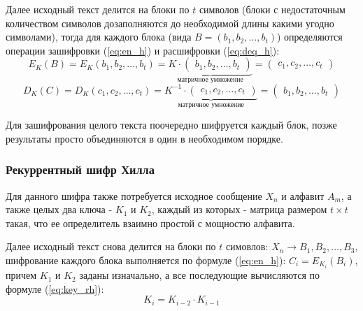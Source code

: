 \documentclass[a4paper]{article}
\begin{document}
  Далее исходный текст делится на блоки по $t$ символов (блоки с недостаточным количеством символов
  дозаполняются до необходимой длины какими угодно символами), тогда для каждого блока (вида $B = (b_1, b_2, \dots, b_t)$)
  определяются операции зашифровки (\ref{eq:en_h}) и расшифровки (\ref{eq:deq_h}):
  \begin{equation}
    E_K(B) = E_K(b_1, b_2, \dots, b_t) = \underset{\text{матричное умножение}}{\underbrace{K \cdot \begin{pmatrix}
        b_1, b_2, \dots, b_t
    \end{pmatrix}}} = \begin{pmatrix}
        c_1, c_2, \dots, c_t
    \end{pmatrix}
    \label{eq:en_h}
  \end{equation}
  \begin{equation}
    D_K(C) = D_K(c_1, c_2, \dots, c_t) = \underset{\text{матричное умножение}}{\underbrace{K^{-1} \cdot 
    \begin{pmatrix}
        c_1, c_2, \dots, c_t
    \end{pmatrix}
    }} = \begin{pmatrix}
        b_1, b_2, \dots, b_t
    \end{pmatrix}
    \label{eq:deq_h}
  \end{equation}

  Для зашифрования целого текста поочередно шифруется каждый блок, позже результаты просто объединяются в один в необходимом порядке.

  \subsubsection{Рекуррентный шифр Хилла}

  Для данного шифра также потребуется исходное сообщение $X_n$ и алфавит $A_m$, а также
  целых два ключа - $K_1$ и $K_2$, каждый из которых - матрица размером $t \times t$ такая, что ее определитель
  взаимно простой с мощностю алфавита.

  Далее исходный текст снова делится на блоки по $t$ симовлов: $X_n \rightarrow B_1, B_2, \dots, B_3$,
  шифрование каждого блока выполняется по формуле (\ref{eq:en_h}): $C_i = E_{K_i}(B_i)$, причем
  $K_1$ и $K_2$ заданы изначально, а все последующие вычисляются по формуле (\ref{eq:key_rh}):
  \begin{equation}
    K_i = K_{i - 2} \cdot K_{i - 1}
    \label{eq:key_rh}
  \end{equation}
\end{document}
